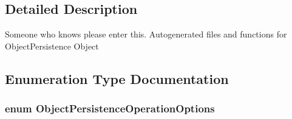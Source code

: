 \subsection{\-Detailed \-Description}
\-Someone who knows please enter this. \-Autogenerated files and functions for \-Object\-Persistence \-Object 

\subsection{\-Enumeration \-Type \-Documentation}
\hypertarget{group___object_persistence_gabaeab57e277096f3dc006b9cd4d65fae}{
\subsubsection[{\-Object\-Persistence\-Operation\-Options}]{\setlength{\rightskip}{0pt plus 5cm}enum {\bf \-Object\-Persistence\-Operation\-Options}}}\label{group___object_persistence_gabaeab57e277096f3dc006b9cd4d65fae}

